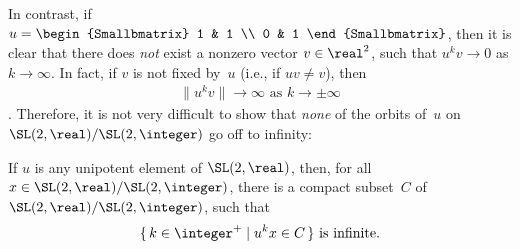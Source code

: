 In contrast, if $u = \begin{Smallbmatrix} 1 & 1 \\ 0 & 1 \end{Smallbmatrix}$, then it is clear that there does \emph{not} exist a nonzero vector $v \in \real^2$, such that $u^k v \to 0$ as $k \to \infty$. In fact, if $v$ is not fixed by~$u$ (i.e., if $uv \neq v$), then
	\begin{align} \label{unvtoinfty}
	\text{$\|u^k v \| \to \infty$ as $k \to \pm \infty$}
	\end{align}
.
Therefore, it is not very difficult to show that \emph{none} of the orbits of~$u$ on $\SL(2,\real)/\SL(2,\integer)$ go off to infinity:

\begin{prop} \label{MargulisRecurSL2R}
If $u$ is any unipotent element of\/ $\SL(2,\real)$, then, for all $x \in \SL(2,\real)/\SL(2,\integer)$, there is a compact subset~$C$ of\/ $\SL(2,\real)/\SL(2,\integer)$, such that
	$$ \text{$\{\, k \in \integer^+ \mid u^k x \in C \,\}$ is infinite} .$$
\end{prop}

